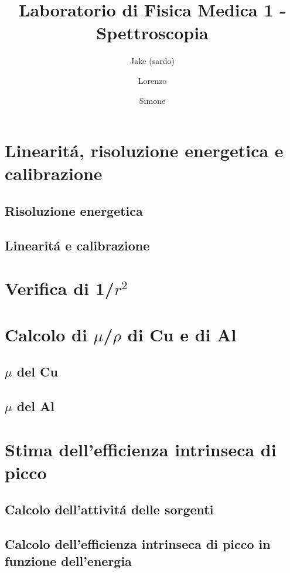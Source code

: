 \documentclass[a4paper]{article}
\begin{document}
\author{Jake (sardo) \and Lorenzo \and Simone}
\title{Laboratorio di Fisica Medica 1 - Spettroscopia}
\maketitle
\tableofcontents

\section{Linearit\'a, risoluzione energetica e calibrazione}
\subsection{Risoluzione energetica}
\subsection{Linearit\'a e calibrazione}


\section{Verifica di 1/$r^2$}


\section{Calcolo di $\mu$/$\rho$ di Cu e di Al}
\subsection{$\mu$ del Cu}
\subsection{$\mu$ del Al}



\section{Stima dell'efficienza intrinseca di picco}
\subsection{Calcolo dell'attivit\'a delle sorgenti}
\subsection{Calcolo dell'efficienza intrinseca di picco in funzione dell'energia}
\end{document}
